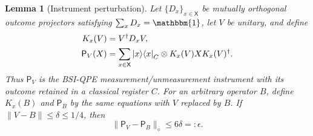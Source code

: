 \documentclass[aps,floatfix,10pt,amssymb,amsmath,superscriptaddress,nofootinbib,longbibliography,nobalancelastpage,twocolumn]{revtex4-2}
\newtheorem{lemma}{Lemma}
\newcommand{\id}{\mathbbm{1}}
\newcommand{\ketbra}[2]{\ket{#1}\!\bra{#2}}
\begin{document}
\begin{lemma}[Instrument perturbation]
\label{lem:instrument}
Let $\{D_x\}_{x\in\mathsf X}$ be mutually orthogonal outcome projectors satisfying $\sum_xD_x=\id$, let $V$ be unitary, and define
\begin{align}
 K_x(V)&=V^\dagger D_xV,\label{eq:KxV}\\
 \mathsf P_V(X)&=\sum_{x\in\mathsf X}\ketbra{x}{x}_{C}
 \otimes K_x(V)XK_x(V)^\dagger.
 \label{eq:PV-instrument}
\end{align}
Thus $\mathsf P_V$ is the BSI-QPE measurement/unmeasurement instrument with its outcome retained in a classical register $C$.  For an arbitrary operator $B$, define $K_x(B)$ and $\mathsf P_B$ by the same equations with $V$ replaced by $B$.  If
$\|V-B\|\leq\delta\leq1/4$, then
\begin{equation}
 \|\mathsf P_V-\mathsf P_B\|_\diamond\leq6\delta=:\epsilon.
 \label{eq:instrument-perturbation}
\end{equation}
\end{lemma}
\end{document}
